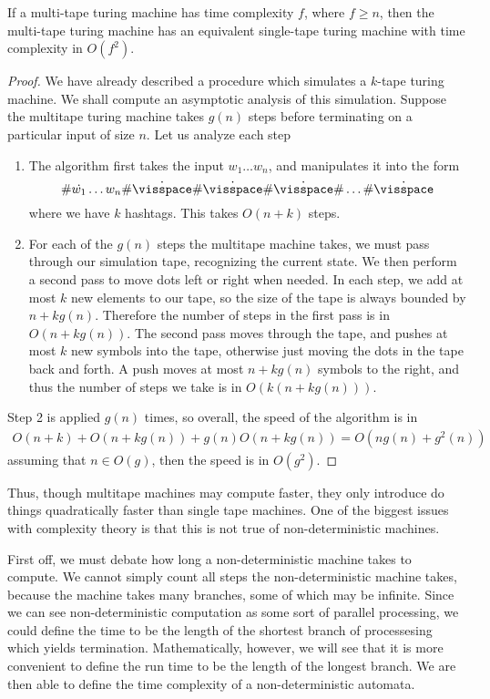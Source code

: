 \begin{theorem}
    If a multi-tape turing machine has time complexity $f$, where $f \geq n$, then the multi-tape turing machine has an equivalent single-tape turing machine with time complexity in $O(f^2)$.
\end{theorem}
\begin{proof}
    We have already described a procedure which simulates a $k$-tape turing machine. We shall compute an asymptotic analysis of this simulation. Suppose the multitape turing machine takes $g(n)$ steps before terminating on a particular input of size $n$. Let us analyze each step
    \begin{enumerate}
        \item The algorithm first takes the input $w_1 \dots w_n$, and manipulates it into the form
        \[ \# \dot{w_1} \dots w_n \# \dot{\visspace} \# \dot{\visspace} \# \dot{\visspace} \# \dots \# \dot{\visspace} \]
        where we have $k$ hashtags. This takes $O(n + k)$ steps.

        \item For each of the $g(n)$ steps the multitape machine takes, we must pass through our simulation tape, recognizing the current state. We then perform a second pass to move dots left or right when needed. In each step, we add at most $k$ new elements to our tape, so the size of the tape is always bounded by $n + k g(n)$. Therefore the number of steps in the first pass is in $O(n + kg(n))$. The second pass moves through the tape, and pushes at most $k$ new symbols into the tape, otherwise just moving the dots in the tape back and forth. A push moves at most $n + kg(n)$ symbols to the right, and thus the number of steps we take is in $O(k(n + kg(n)))$.
    \end{enumerate}
    Step 2 is applied $g(n)$ times, so overall, the speed of the algorithm is in
    \begin{align*}
        O(n + k) + O(n + kg(n)) + g(n) O(n + kg(n)) = O(ng(n) + g^2(n))
    \end{align*}
    assuming that $n \in O(g)$, then the speed is in $O(g^2)$.
\end{proof}

Thus, though multitape machines may compute faster, they only introduce do things quadratically faster than single tape machines. One of the biggest issues with complexity theory is that this is not true of non-deterministic machines.

First off, we must debate how long a non-deterministic machine takes to compute. We cannot simply count all steps the non-deterministic machine takes, because the machine takes many branches, some of which may be infinite. Since we can see non-deterministic computation as some sort of parallel processing, we could define the time to be the length of the shortest branch of processesing which yields termination. Mathematically, however, we will see that it is more convenient to define the run time to be the length of the longest branch. We are then able to define the time complexity of a non-deterministic automata.

